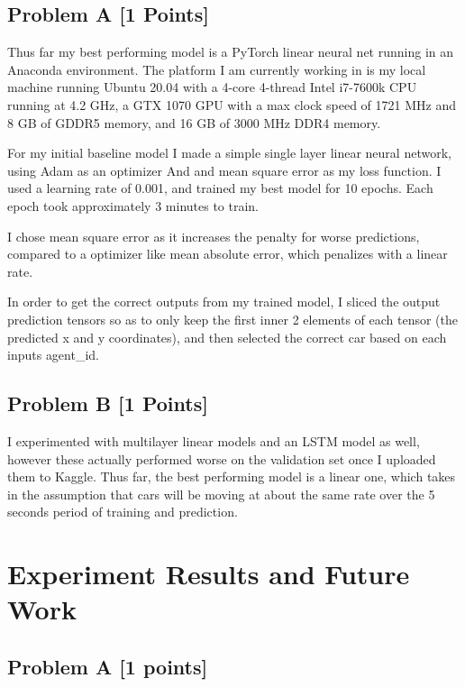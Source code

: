 \documentclass{article}
\begin{document}
    \subsection{Problem A [1 Points]}
      Thus far my best performing model is a PyTorch linear neural net running in an Anaconda environment.
      The platform I am currently working in is my local machine running Ubuntu 20.04 with a 4-core 4-thread Intel i7-7600k CPU 
      running at 4.2 GHz, a GTX 1070 GPU with a max clock speed of 1721 MHz and 8 GB of GDDR5 memory, and 16 GB of 3000 MHz DDR4 memory.
      
      For my initial baseline model I made a simple single layer linear neural network, using Adam as an optimizer And
      and mean square error as my loss function. I used a learning rate of 0.001, and  trained my best model for
      10 epochs. Each epoch took approximately 3 minutes to train.
      
      I chose mean square error as it increases the penalty for worse predictions, compared to a optimizer like
      mean absolute error, which penalizes with a linear rate. 
      
      In order to get the correct outputs from my trained model, I sliced the output prediction tensors so as to only
      keep the first inner 2 elements of each tensor (the predicted x and y coordinates), and then selected the correct car based on
      each inputs  {\selectfont agent\_id}.

    \subsection{Problem B [1 Points]}        
      I experimented with multilayer linear models and an LSTM model as well, however these actually performed worse on 
      the validation set once I uploaded them to Kaggle. Thus far, the best performing model is a linear one, which
      takes in the assumption that cars will be moving at about the same rate over the 5 seconds period of training and prediction.
      
  \section{Experiment Results and Future Work}
  \label{headings}
    \subsection{Problem A [1 points]}
          
\end{document}
